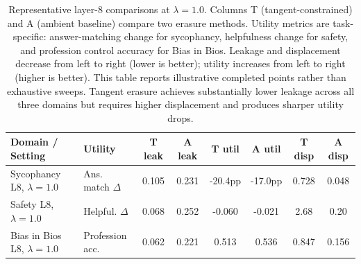 \begin{table}[t]
\centering
\caption{Representative layer-8 comparisons at $\lambda=1.0$. Columns T (tangent-constrained) and A (ambient baseline) compare two erasure methods. Utility metrics are task-specific: answer-matching change for sycophancy, helpfulness change for safety, and profession control accuracy for Bias in Bios. Leakage and displacement decrease from left to right (lower is better); utility increases from left to right (higher is better). This table reports illustrative completed points rather than exhaustive sweeps. Tangent erasure achieves substantially lower leakage across all three domains but requires higher displacement and produces sharper utility drops.}
\label{tab:completed_results_summary}
\small
\begin{tabular}{llcccccc}
\toprule
Domain / Setting & Utility & T leak & A leak & T util & A util & T disp & A disp \\
\midrule
Sycophancy L8, $\lambda=1.0$ & Ans. match $\Delta$ & 0.105 & 0.231 & -20.4pp & -17.0pp & 0.728 & 0.048 \\
Safety L8, $\lambda=1.0$ & Helpful. $\Delta$ & 0.068 & 0.252 & -0.060 & -0.021 & 2.68 & 0.20 \\
Bias in Bios L8, $\lambda=1.0$ & Profession acc. & 0.062 & 0.221 & 0.513 & 0.536 & 0.847 & 0.156 \\
\bottomrule
\end{tabular}
\end{table}

